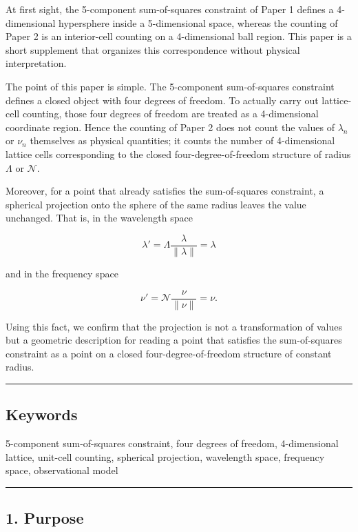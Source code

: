 \documentclass[
]{article}
\begin{document}
At first sight, the 5-component sum-of-squares constraint of Paper 1
defines a 4-dimensional hypersphere inside a 5-dimensional space,
whereas the counting of Paper 2 is an interior-cell counting on a
4-dimensional ball region. This paper is a short supplement that
organizes this correspondence without physical interpretation.

The point of this paper is simple. The 5-component sum-of-squares
constraint defines a closed object with four degrees of freedom. To
actually carry out lattice-cell counting, those four degrees of freedom
are treated as a 4-dimensional coordinate region. Hence the counting of
Paper 2 does not count the values of \(\lambda_n\) or \(\nu_n\)
themselves as physical quantities; it counts the number of 4-dimensional
lattice cells corresponding to the closed four-degree-of-freedom
structure of radius \(\Lambda\) or \(\mathcal{N}\).

Moreover, for a point that already satisfies the sum-of-squares
constraint, a spherical projection onto the sphere of the same radius
leaves the value unchanged. That is, in the wavelength space

\[
\lambda'=\Lambda\frac{\lambda}{\|\lambda\|}=\lambda
\]

and in the frequency space

\[
\nu'=\mathcal{N}\frac{\nu}{\|\nu\|}=\nu .
\]

Using this fact, we confirm that the projection is not a transformation
of values but a geometric description for reading a point that satisfies
the sum-of-squares constraint as a point on a closed
four-degree-of-freedom structure of constant radius.

\begin{center}\rule{0.5\linewidth}{0.5pt}\end{center}

\subsection{Keywords}\label{keywords}

5-component sum-of-squares constraint, four degrees of freedom,
4-dimensional lattice, unit-cell counting, spherical projection,
wavelength space, frequency space, observational model

\begin{center}\rule{0.5\linewidth}{0.5pt}\end{center}

\subsection{1. Purpose}\label{purpose}
\end{document}
